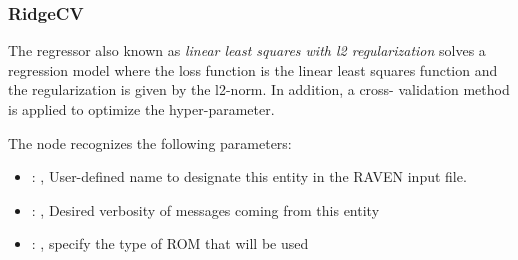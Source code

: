 \subsubsection{RidgeCV}
  The  regressor also known as                              \textit{linear least
  squares with l2 regularization} solves a regression                              model where the
  loss function is the linear least squares function and the
  regularization is given by the l2-norm.                              In addition, a cross-
  validation method is applied to optimize the hyper-parameter.

  The  node recognizes the following parameters:
    \begin{itemize}
      \item {}: , 
        User-defined name to designate this entity in the RAVEN input file.
      \item {}: , 
        Desired verbosity of messages coming from this entity
      \item {}: , 
        specify the type of ROM that will be used
  \end{itemize}

